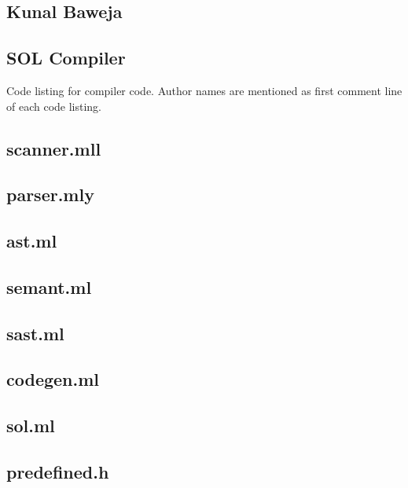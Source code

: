 \documentclass[letterpaper,12pt]{report}
\begin{document}
  \section{Kunal Baweja}
\begin{appendices}

\chapter{SOL Compiler}

Code listing for compiler code. Author names are mentioned as first comment line of each code listing.

    \section{scanner.mll}
    

    \section{parser.mly}
    

    \section{ast.ml}
    

    \section{semant.ml}
    

    \section{sast.ml}
    

    \section{codegen.ml}
    

    \section{sol.ml}
    

    \section{predefined.h}
    


\end{appendices}
\end{document}
